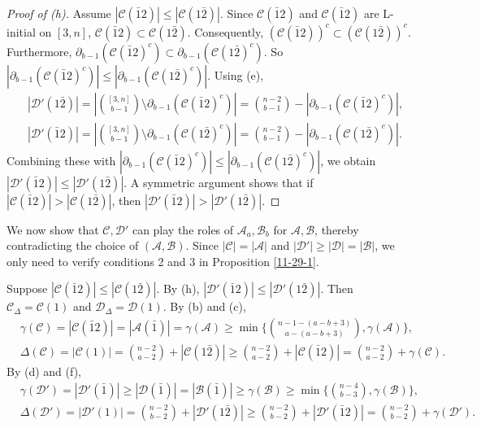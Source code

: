 \documentclass[11pt]{article}
\newcommand{\m}{\mathcal}
\begin{document}
\begin{proof}[Proof of (h)]
Assume $|\mathcal{C}(\bar12)|\le |\mathcal{C}(1\bar{2})|$.
Since $\m C(\bar12)$ and $\m C(\bar12)$ are L-initial on $[3,n]$, $\mathcal{C}(\bar12)\subset \mathcal{C}(1\bar{2})$.
Consequently, 
$(\mathcal{C}(\bar12))^c\subset (\mathcal{C}(1\bar{2}))^c$.
Furthermore, 
$\partial_{b-1}(\mathcal{C}(\bar12)^c)\subset \partial_{b-1}(\mathcal{C}(1\bar{2})^c)$.
So
$|\partial_{b-1}(\mathcal{C}(\bar{1}2)^c)| \le |\partial_{b-1}(\mathcal{C}(1\bar{2})^c)|$. Using (e), 
\begin{align*}
    &|\mathcal{D}'(1\bar{2})|=|{[3,n]\choose b-1}\setminus \partial_{b-1}(\mathcal{C}(\bar{1}2)^c)|={n-2\choose b-1}-|\partial_{b-1}(\mathcal{C}(\bar{1}2)^c)|,\\
    &|\mathcal{D}'(\bar{1}2)|=|{[3,n]\choose b-1}\setminus \partial_{b-1}(\mathcal{C}(1\bar{2})^c)|={n-2\choose b-1}-|\partial_{b-1}(\mathcal{C}(1\bar{2})^c)|.
\end{align*}
Combining these with $|\partial_{b-1}(\mathcal{C}(\bar{1}2)^c)| \le |\partial_{b-1}(\mathcal{C}(1\bar{2})^c)|$, we obtain $|\mathcal{D}'(\bar{1}2)|\le |\mathcal{D}'(1\bar{2})|$.
A symmetric argument shows that if  $|\mathcal{C}(\bar12)|> |\mathcal{C}(1\bar{2})|$, then $|\mathcal{D}'(\bar{1}2)|> |\mathcal{D}'(1\bar{2})|$. 
\end{proof}

We now show that $\m C, \m D'$ can play the roles of $\m A_a, \m B_b$ for $\m A, \m B$, thereby contradicting the choice of $(\m A, \m B)$. Since  $|\m C|=|\m A|$ and $|\m D'|\ge |\m D|=|\m B|$, we only need to verify conditions 2 and 3 in Proposition \ref{11-29-1}. 

Suppose $|\mathcal{C}(\bar12)|\le |\mathcal{C}(1\bar{2})|$. 
By (h), $|\mathcal{D}'(\bar12)|\le |\mathcal{D}'(1\bar{2})|$.
Then $\m C_{\Delta}=\m C(1)$ and $\m D_{\Delta}=\m D(1)$. 
By (b) and (c), 
\begin{align*}
    &\gamma(\mathcal{C})=|\mathcal{C}(\bar12)|=|\mathcal{A}(\bar{1})|=\gamma(\m A)\ge \min \{{n-1-(a-b+3)\choose a-(a-b+3)}, \gamma(\mathcal{A})\},\\
    &\Delta(\mathcal{C})=|\m C(1)|={n-2\choose a-2}+|\m C(1\bar2)|\ge {n-2\choose a-2}+|\m C(\bar12)|= {n-2\choose a-2}+\gamma(\mathcal{C}).
\end{align*}
By (d) and (f), 
\begin{align*}
    &\gamma(\mathcal{D}')=|\mathcal{D}'(\bar1)|\ge |\mathcal{D}(\bar1)|=|\m B(\bar1)|\ge \gamma(\m B)\ge \min \{{n-4\choose b-3}, \gamma(\mathcal{B})\},\\
    &\Delta(\mathcal{D}')=|\m D'(1)|={n-2\choose b-2}+|\m D'(1\bar2)|\ge {n-2\choose b-2}+|\m D'(\bar12)|= {n-2\choose b-2}+\gamma(\mathcal{D}').
\end{align*}
\end{document}
